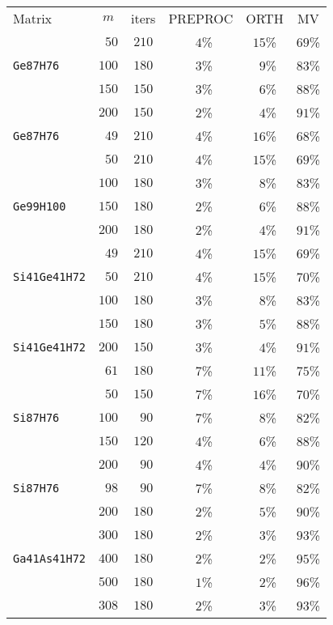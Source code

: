 \begin{tabular}{l|c|c|c|c|c}
\hline
\multirow{2}{*}{Matrix} & \multirow{2}{*}{$m$} & \multirow{2}{*}{iters} & \multirow{2}{*}{PREPROC} & \multirow{2}{*}{ORTH} & \multirow{2}{*}{MV} \\
 & & & & & \\\hline
\hline
  & $\phantom{0}50$ & $210$ & $\phantom{0}4$\% & $15$\% & $69$\%\\
\verb|Ge87H76| & $100$ & $180$ & $\phantom{0}3$\% & $\phantom{0}9$\% & $83$\%\\
  & $150$ & $150$ & $\phantom{0}3$\% & $\phantom{0}6$\% & $88$\%\\\hline
  & $200$ & $150$ & $\phantom{0}2$\% & $\phantom{0}4$\% & $91$\%\\
\verb|Ge87H76| & $\phantom{0}49$ & $210$ & $\phantom{0}4$\% & $16$\% & $68$\%\\
  & $\phantom{0}50$ & $210$ & $\phantom{0}4$\% & $15$\% & $69$\%\\\hline
  & $100$ & $180$ & $\phantom{0}3$\% & $\phantom{0}8$\% & $83$\%\\
\verb|Ge99H100| & $150$ & $180$ & $\phantom{0}2$\% & $\phantom{0}6$\% & $88$\%\\
  & $200$ & $180$ & $\phantom{0}2$\% & $\phantom{0}4$\% & $91$\%\\\hline
  & $\phantom{0}49$ & $210$ & $\phantom{0}4$\% & $15$\% & $69$\%\\
\verb|Si41Ge41H72| & $\phantom{0}50$ & $210$ & $\phantom{0}4$\% & $15$\% & $70$\%\\
  & $100$ & $180$ & $\phantom{0}3$\% & $\phantom{0}8$\% & $83$\%\\\hline
  & $150$ & $180$ & $\phantom{0}3$\% & $\phantom{0}5$\% & $88$\%\\
\verb|Si41Ge41H72| & $200$ & $150$ & $\phantom{0}3$\% & $\phantom{0}4$\% & $91$\%\\
  & $\phantom{0}61$ & $180$ & $\phantom{0}7$\% & $11$\% & $75$\%\\\hline
  & $\phantom{0}50$ & $150$ & $\phantom{0}7$\% & $16$\% & $70$\%\\
\verb|Si87H76| & $100$ & $\phantom{0}90$ & $\phantom{0}7$\% & $\phantom{0}8$\% & $82$\%\\
  & $150$ & $120$ & $\phantom{0}4$\% & $\phantom{0}6$\% & $88$\%\\\hline
  & $200$ & $\phantom{0}90$ & $\phantom{0}4$\% & $\phantom{0}4$\% & $90$\%\\
\verb|Si87H76| & $\phantom{0}98$ & $\phantom{0}90$ & $\phantom{0}7$\% & $\phantom{0}8$\% & $82$\%\\
  & $200$ & $180$ & $\phantom{0}2$\% & $\phantom{0}5$\% & $90$\%\\\hline
  & $300$ & $180$ & $\phantom{0}2$\% & $\phantom{0}3$\% & $93$\%\\
\verb|Ga41As41H72| & $400$ & $180$ & $\phantom{0}2$\% & $\phantom{0}2$\% & $95$\%\\
  & $500$ & $180$ & $\phantom{0}1$\% & $\phantom{0}2$\% & $96$\%\\\hline
  & $308$ & $180$ & $\phantom{0}2$\% & $\phantom{0}3$\% & $93$\%\\
\end{tabular}
